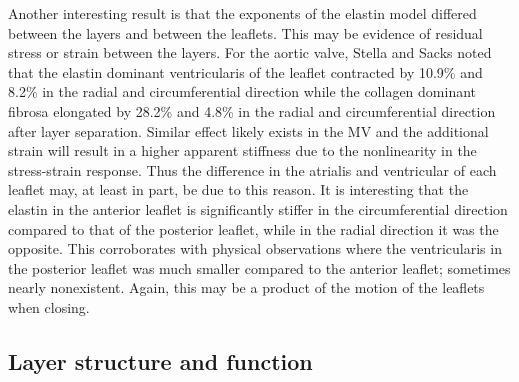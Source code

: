     Another interesting result is that the exponents of the elastin model differed between the layers and between the leaflets. This may be evidence of residual stress or strain between the layers. For the aortic valve, Stella and Sacks \cite{stella_biaxial_2007} noted that the elastin dominant ventricularis of the leaflet contracted by 10.9\% and 8.2\% in the radial and circumferential direction while the collagen dominant fibrosa elongated by 28.2\% and 4.8\% in the radial and circumferential direction after layer separation. Similar effect likely exists in the MV and the additional strain will result in a higher apparent stiffness due to the nonlinearity in the stress-strain response. Thus the difference in the atrialis and ventricular of each leaflet may, at least in part, be due to this reason. It is interesting that the elastin in the anterior leaflet is significantly stiffer in the circumferential direction compared to that of the posterior leaflet, while in the radial direction it was the opposite. This corroborates with physical observations where the ventricularis in the posterior leaflet was much smaller compared to the anterior leaflet; sometimes nearly nonexistent. Again, this may be a product of the motion of the leaflets when closing.
    
    
    
    
\subsection{Layer structure and function}

